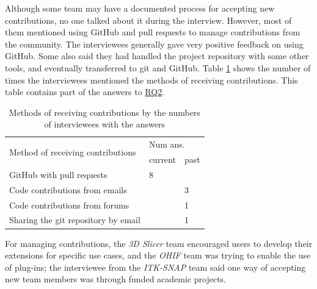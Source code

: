 \documentclass[preprint,12pt,authoryear]{elsarticle}
\begin{document}

Although some team may have a documented process for accepting new
contributions, no one talked about it during the interview. However, most of
them mentioned using GitHub and pull requests to manage contributions from the
community. The interviewees generally gave very positive feedback on using
GitHub. Some also said they had handled the project repository with some other
tools, and eventually transferred to git and GitHub. Table
\ref{tab_method_receive_contributions} shows the number of times the
interviewees mentioned the methods of receiving contributions. This table
contains part of the answers to \hyperlink{rq2}{RQ2}.

\begin{table}[ht]
\centering
\begin{tabular}{lll}
\hline
\multirow{2}{*}{Method of receiving contributions} & \multicolumn{2}{l}{Num ans.} \\ \cline{2-3} 
 & current & past \\ \hline
GitHub with pull requests & 8 & \\
Code contributions from emails & & 3 \\
Code contributions from forums & & 1 \\
Sharing the git repository by email & & 1 \\ \hline
\end{tabular}
\caption{\label{tab_method_receive_contributions}Methods of receiving
contributions by the numbers of interviewees with the answers}
\end{table}

For managing contributions, the \textit{3D Slicer} team encouraged users to
develop their extensions for specific use cases, and the \textit{OHIF} team was
trying to enable the use of plug-ins; the interviewee from the \textit{ITK-SNAP}
team said one way of accepting new team members was through funded academic
projects.
\end{document}
